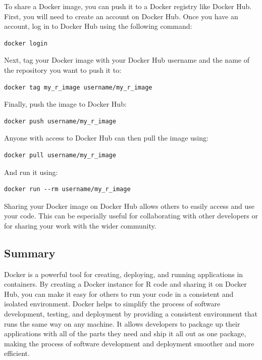 \documentclass[
]{book}
\begin{document}
To share a Docker image, you can push it to a Docker registry like Docker Hub. First, you will need to create an account on Docker Hub. Once you have an account, log in to Docker Hub using the following command:

\begin{verbatim}
docker login
\end{verbatim}

Next, tag your Docker image with your Docker Hub username and the name of the repository you want to push it to:

\begin{verbatim}
docker tag my_r_image username/my_r_image
\end{verbatim}

Finally, push the image to Docker Hub:

\begin{verbatim}
docker push username/my_r_image
\end{verbatim}

Anyone with access to Docker Hub can then pull the image using:

\begin{verbatim}
docker pull username/my_r_image
\end{verbatim}

And run it using:

\begin{verbatim}
docker run --rm username/my_r_image
\end{verbatim}

Sharing your Docker image on Docker Hub allows others to easily access and use your code. This can be especially useful for collaborating with other developers or for sharing your work with the wider community.

\hypertarget{summary}{%
\subsection{Summary}\label{summary}}

Docker is a powerful tool for creating, deploying, and running applications in containers. By creating a Docker instance for R code and sharing it on Docker Hub, you can make it easy for others to run your code in a consistent and isolated environment. Docker helps to simplify the process of software development, testing, and deployment by providing a consistent environment that runs the same way on any machine. It allows developers to package up their applications with all of the parts they need and ship it all out as one package, making the process of software development and deployment smoother and more efficient.
\end{document}
